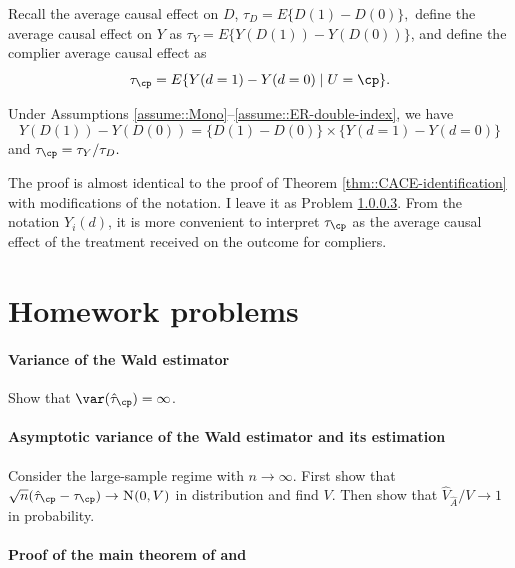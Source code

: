 Recall the average causal effect on $D$, $\tau_D = E\{D(1)  - D(0) \},$ define the average causal effect on $Y$ as $\tau_Y = E\{ Y(D(1)) - Y(D(0))  \}$, and define the complier average causal effect as 
$$
\tau_\cp =  E\{  Y(d=1) - Y(d=0) \mid U = \cp \}.
$$

\begin{theorem}\label{thm::iv-double-index}
Under Assumptions \ref{assume::Mono}--\ref{assume::ER-double-index}, we have 
$$
Y(D(1)) - Y(D(0)) = \{  D(1)  - D(0) \} \times \{ Y(d=1) - Y(d=0) \}
$$
and  
$
\tau_\cp   =   \tau_Y /  \tau_D  .
$
\end{theorem}

The proof is almost identical to the proof of Theorem \ref{thm::CACE-identification} with modifications of the notation. I leave it as Problem \ref{para::iv-alternative-form-theorem}. From the notation $Y_i(d)$, it is more convenient to interpret $\tau_\cp$ as the average causal effect of the treatment received on the outcome for compliers. 



 




 
\section{Homework problems}



 
\paragraph{Variance of the Wald estimator}\label{problem::infinite-var-iv}

Show that $\var(\hat{\tau}_\cp) = \infty$. 



\paragraph{Asymptotic variance of the Wald estimator and its estimation}\label{problem::var-iv-estimate}


Consider the large-sample regime with $n\rightarrow \infty$. 
First show that $\sqrt{n}(\hat{\tau}_\cp - \tau_\cp) \rightarrow \textsc{N}(0, V)$ in distribution and find $V$. Then show that $\hat{V}_{\hat{A}} /V \rightarrow 1$ in probability. 

 
 
 
\paragraph{Proof of the main theorem of  \citet{imbens1994identification} and \citet{angrist1996identification}} 
 \label{para::iv-alternative-form-theorem}
 
